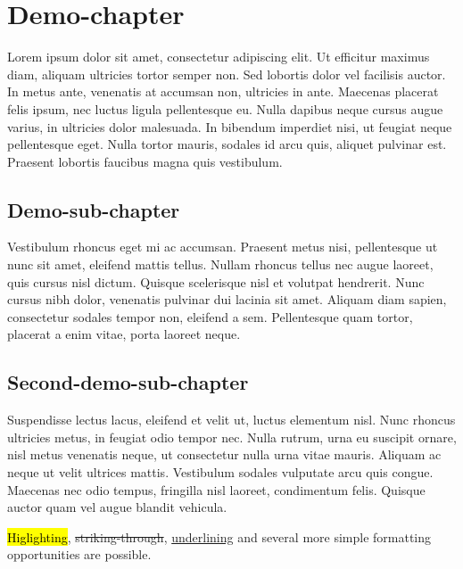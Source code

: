 
\chapter{Demo-chapter}

Lorem ipsum dolor sit amet, consectetur adipiscing elit. Ut efficitur maximus diam, aliquam ultricies tortor semper non. Sed lobortis dolor vel facilisis auctor. In metus ante, venenatis at accumsan non, ultricies in ante. Maecenas placerat felis ipsum, nec luctus ligula pellentesque eu. Nulla dapibus neque cursus augue varius, in ultricies dolor malesuada. In bibendum imperdiet nisi, ut feugiat neque pellentesque eget. Nulla tortor mauris, sodales id arcu quis, aliquet pulvinar est. Praesent lobortis faucibus magna quis vestibulum.

\section{Demo-sub-chapter}

Vestibulum rhoncus eget mi ac accumsan. Praesent metus nisi, pellentesque ut nunc sit amet, eleifend mattis tellus. Nullam rhoncus tellus nec augue laoreet, quis cursus nisl dictum. Quisque scelerisque nisl et volutpat hendrerit. Nunc cursus nibh dolor, venenatis pulvinar dui lacinia sit amet. Aliquam diam sapien, consectetur sodales tempor non, eleifend a sem. Pellentesque quam tortor, placerat a enim vitae, porta laoreet neque.

\section{Second-demo-sub-chapter}


Suspendisse lectus lacus, eleifend et velit ut, luctus elementum nisl. Nunc rhoncus ultricies metus, in feugiat odio tempor nec. Nulla rutrum, urna eu suscipit ornare, nisl metus venenatis neque, ut consectetur nulla urna vitae mauris. Aliquam ac neque ut velit ultrices mattis. Vestibulum sodales vulputate arcu quis congue. Maecenas nec odio tempus, fringilla nisl laoreet, condimentum felis. Quisque auctor quam vel augue blandit vehicula.

\hl{Higlighting}, \st{striking-through}, \ul{underlining} and several more simple formatting opportunities are possible.


